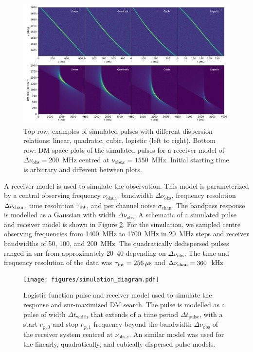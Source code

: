 \documentclass[a4paper,fleqn,usenatbib]{mnras}
\begin{document}
\begin{figure}
    \includegraphics[width=1.0\linewidth]{figures/sim_pulse_spectra_dm.pdf}
    \caption{Top row: examples of simulated pulses with different dispersion
    relations: linear, quadratic, cubic, logistic (left to right). Bottom row:
    DM-space plots of the simulated pulses for a receiver model of $\Delta
    \nu_{\textrm{obs}} = 200$~MHz centred at $\nu_{\textrm{obs,c}} = 1550$~MHz.
    Initial starting time is arbitrary and different between plots.
    }
    \label{fig:sim_pulse_spectra_dm}
\end{figure}

A receiver model is used to simulate the observation. This model is
parameterized by a central observing frequency $\nu_{\textrm{obs,c}}$, bandwidth
$\Delta \nu_{\textrm{obs}}$, frequency resolution $\Delta \nu_{\rm chan}$, time
resolution $\tau_{\rm int}$, and per channel noise $\sigma_{\textrm{chan}}$. The
bandpass response is modelled as a Gaussian with width $\Delta
\nu_{\textrm{obs}}$. A schematic of a simulated pulse and receiver model is
shown in Figure \ref{fig:simulation_diagram}. For the simulation, we sampled
centre observing frequencies from 1400~MHz to 1700~MHz in 20~MHz steps and
receiver bandwidths of 50, 100, and 200~MHz. The quadratically dedispersed
pulses ranged in \gls{snr} from approximately 20--40 depending on $\Delta
\nu_{\textrm{obs}}$. The time and frequency resolution of the data was
$\tau_{\rm int} = 256\,\mu \textrm{s}$ and $\Delta \nu_{\rm chan} = 360$~kHz.

\begin{figure}
    \texttt{[image: figures/simulation\_diagram.pdf]}
    \caption{Logistic function pulse and receiver model used to simulate the
    response and \gls{snr}-maximized DM search. The pulse is modelled as a pulse
    of width $\Delta t_{\textrm{width}}$ that extends of a time period $\Delta
    t_{\textrm{pulse}}$, with a start $\nu_{p,0}$ and stop $\nu_{p,1}$ frequency
    beyond the bandwidth $\Delta \nu_{\textrm{obs}}$ of the receiver system
    centred at $\nu_{\textrm{obs,c}}$. An similar model was used for the
    linearly, quadratically, and cubically dispersed pulse models.
    }
    \label{fig:simulation_diagram}
\end{figure}
\end{document}
